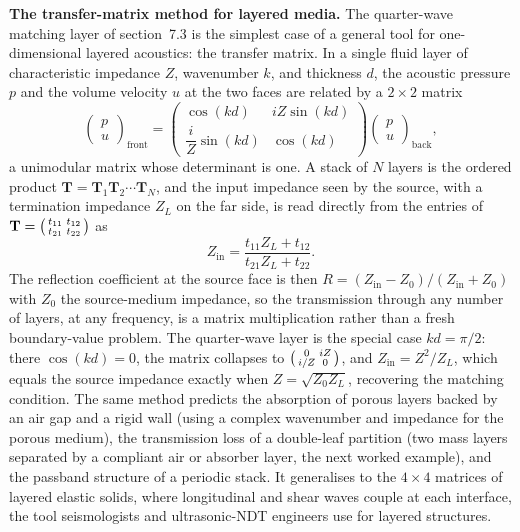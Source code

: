 \begin{mastery}
\textbf{The transfer-matrix method for layered media.} The quarter-wave
matching layer of section~7.3 is the simplest case of a general tool for
one-dimensional layered acoustics: the transfer matrix. In a single fluid
layer of characteristic impedance $Z$, wavenumber $k$, and thickness $d$,
the acoustic pressure $p$ and the volume velocity $u$ at the two faces are
related by a $2\times 2$ matrix
\[
\begin{pmatrix} p \\ u \end{pmatrix}_{\text{front}}
=
\begin{pmatrix}
\cos(kd) & iZ\sin(kd) \\[2pt]
\dfrac{i}{Z}\sin(kd) & \cos(kd)
\end{pmatrix}
\begin{pmatrix} p \\ u \end{pmatrix}_{\text{back}} ,
\]
a unimodular matrix whose determinant is one. A stack of $N$ layers is the
ordered product $\mathbf{T} = \mathbf{T}_1\mathbf{T}_2\cdots\mathbf{T}_N$,
and the input impedance seen by the source, with a termination impedance
$Z_L$ on the far side, is read directly from the entries of
$\mathbf{T}=\begin{psmallmatrix} t_{11}&t_{12}\\ t_{21}&t_{22}
\end{psmallmatrix}$ as
\[
Z_{\text{in}} = \frac{t_{11}Z_L + t_{12}}{t_{21}Z_L + t_{22}} .
\]
The reflection coefficient at the source face is then
$R=(Z_{\text{in}}-Z_0)/(Z_{\text{in}}+Z_0)$ with $Z_0$ the source-medium
impedance, so the transmission through any number of layers, at any
frequency, is a matrix multiplication rather than a fresh boundary-value
problem. The quarter-wave layer is the special case $kd=\pi/2$: there
$\cos(kd)=0$, the matrix collapses to
$\begin{psmallmatrix} 0 & iZ \\ i/Z & 0\end{psmallmatrix}$, and
$Z_{\text{in}}=Z^2/Z_L$, which equals the source impedance exactly when
$Z=\sqrt{Z_0 Z_L}$, recovering the matching condition. The same method
predicts the absorption of porous layers backed by an air gap and a rigid
wall (using a complex wavenumber and impedance for the porous medium), the
transmission loss of a double-leaf partition (two mass layers separated by
a compliant air or absorber layer, the next worked example), and the
passband structure of a periodic stack. It generalises to the
$4\times 4$ matrices of layered elastic solids, where longitudinal and
shear waves couple at each interface, the tool seismologists and
ultrasonic-NDT engineers use for layered structures.
\end{mastery}

